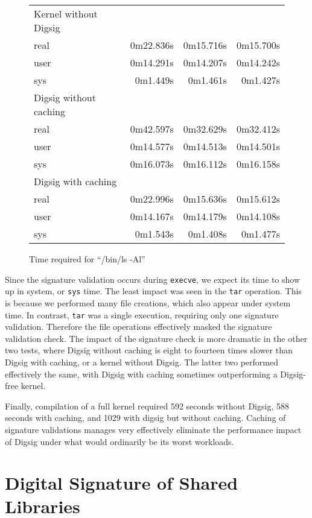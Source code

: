\documentclass{article}
\begin{document}
\begin{figure}
\begin{tabular}{|l|r|r|r|}
\hline
	Kernel without Digsig & & & \\
	real   & 0m22.836s& 0m15.716s &0m15.700s \\
	user   & 0m14.291s& 0m14.207s &0m14.242s \\
	sys    & 0m1.449s &0m1.461s &0m1.427s \\
\hline
	Digsig without caching & & & \\
	real   & 0m42.597s& 0m32.629s &0m32.412s \\
	user   & 0m14.577s& 0m14.513s &0m14.501s \\
	sys    & 0m16.073s& 0m16.112s &0m16.158s \\
\hline
	Digsig with caching & & & \\
	real   & 0m22.996s& 0m15.636s &0m15.612s \\
	user   & 0m14.167s& 0m14.179s &0m14.108s \\
	sys    & 0m1.543s &0m1.408s   & 0m1.477s \\
\hline
\end{tabular}
\caption{Time required for ``/bin/ls -Al''}\label{fig:comptimings}
\end{figure}

Since the signature validation occurs during {\tt execve}, we expect its
time to show up in system, or {\tt sys} time.
The least impact was seen in the {\tt tar} operation.  This is because
we performed many file creations, which also appear under system time.
In contrast, {\tt tar} was a single execution, requiring only one signature
validation.  Therefore the file operations effectively masked the signature
validation check.  The
impact of the signature check is more dramatic in the other two tests,
where Digsig without caching is eight to fourteen times slower than
Digsig with caching, or a kernel without Digsig.  The latter two
performed effectively the same, with Digsig with caching sometimes
outperforming a Digsig-free kernel.

Finally, compilation of a full kernel required 592 seconds without
Digsig, 588 seconds with caching, and 1029 with digsig but without caching.
Caching of signature validations manages very effectively
eliminate the performance impact of Digsig under what would ordinarily
be its worst workloads.

\section{Digital Signature of Shared Libraries}
\end{document}
